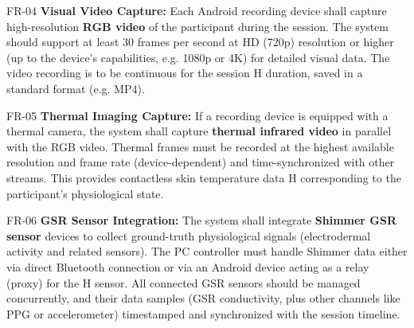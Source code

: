 \documentclass[11pt,a4paper]{report}
\begin{document}
  FR-04                   \textbf{Visual Video Capture:} Each Android recording device shall capture high-resolution \textbf{RGB video} of the participant during the session. The system should support at least 30 frames per second at HD (720p) resolution or higher (up to the device's capabilities, e.g. 1080p or 4K) for detailed visual data. The video recording is to be continuous for the session         H
                          duration, saved in a standard format (e.g. MP4).                                                                                                                                                                                                                                                                                                                                   

  FR-05                   \textbf{Thermal Imaging Capture:} If a recording device is equipped with a thermal camera, the system shall capture \textbf{thermal infrared video} in parallel with the RGB video. Thermal frames must be recorded at the highest available resolution and frame rate (device-dependent) and time-synchronized with other streams. This provides contactless skin temperature data          H
                          corresponding to the participant's physiological state.                                                                                                                                                                                                                                                                                                                            

  FR-06                   \textbf{GSR Sensor Integration:} The system shall integrate \textbf{Shimmer GSR sensor} devices to collect ground-truth physiological signals (electrodermal activity and related sensors). The PC controller must handle Shimmer data either via direct Bluetooth connection or via an Android device acting as a relay (proxy) for the                                                     H
                          sensor\cite{AppleHealthWatch2019}. All connected GSR sensors should be managed concurrently, and their data samples (GSR conductivity, plus other channels like PPG or accelerometer) timestamped and synchronized with the session timeline.                             
\end{document}
